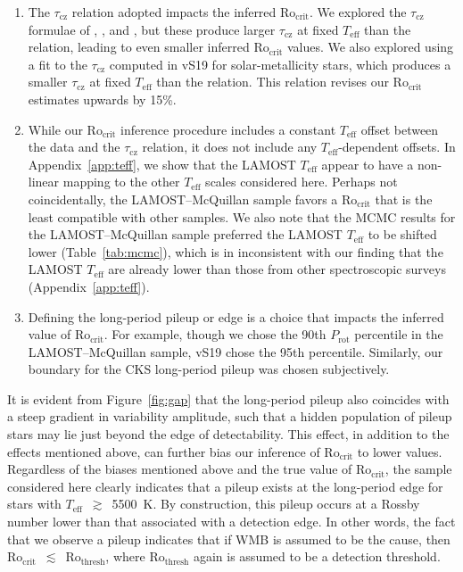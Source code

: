 \documentclass[trackchanges,twocolumn]{aastex631}
\newcommand{\taucz}{$\tau_\mathrm{cz}$\xspace}
\newcommand{\rocrit}{$\mathrm{Ro_{crit}}$\xspace}
\newcommand{\rothresh}{$\mathrm{Ro_{thresh}}$\xspace}
\newcommand{\lamostmcq}{LAMOST--McQuillan\xspace}
\newcommand{\teffmin}{5500~K\xspace}
\newcommand{\jvs}{vS19\xspace}
\newcommand{\teff}{\ensuremath{T_{\mathrm{eff}}}\xspace}
\newcommand{\prot}{\ensuremath{P_\mathrm{rot}}\xspace}
\begin{document}
\begin{enumerate}
    \item The \taucz relation adopted impacts the inferred \rocrit. We explored the \taucz formulae of \citet{BarnesKim2010}, \citet{Landin2010}, and \citet{Amard2019}, but these produce larger \taucz at fixed \teff than the \citet{CranmerSaar2011} relation, leading to even smaller inferred \rocrit values. We also explored using a fit to the \taucz computed in \jvs for solar-metallicity stars, which produces a smaller \taucz at fixed \teff than the \citet{CranmerSaar2011} relation. This relation revises our \rocrit estimates upwards by 15\%. 
    \item While our \rocrit inference procedure includes a constant \teff offset between the data and the \taucz relation, it does not include any \teff-dependent offsets. In Appendix~\ref{app:teff}, we show that the LAMOST \teff appear to have a non-linear mapping to the other \teff scales considered here. Perhaps not coincidentally, the \lamostmcq sample favors a \rocrit that is the least compatible with other samples. We also note that the MCMC results for the \lamostmcq sample preferred the LAMOST \teff to be shifted lower (Table~\ref{tab:mcmc}), which is in inconsistent with our finding that the LAMOST \teff are already lower than those from other spectroscopic surveys (Appendix~\ref{app:teff}). 
    \item Defining the long-period pileup or edge is a choice that impacts the inferred value of \rocrit. For example, though we chose the 90th \prot percentile in the \lamostmcq sample, \jvs chose the 95th percentile. Similarly, our boundary for the CKS long-period pileup was chosen subjectively.
\end{enumerate}

It is evident from Figure~\ref{fig:gap} that the long-period pileup also coincides with a steep gradient in variability amplitude, such that a hidden population of pileup stars may lie just beyond the edge of detectability. This effect, in addition to the effects mentioned above, can further bias our inference of \rocrit to lower values. Regardless of the biases mentioned above and the true value of \rocrit, the sample considered here clearly indicates that a pileup exists at the long-period edge for stars with \teff~$\gtrsim$~\teffmin. By construction, this pileup occurs at a Rossby number lower than that associated with a detection edge. In other words, the fact that we observe a pileup indicates that if WMB is assumed to be the cause, then \rocrit~$\lesssim$~\rothresh, where \rothresh again is assumed to be a detection threshold.
\end{document}
